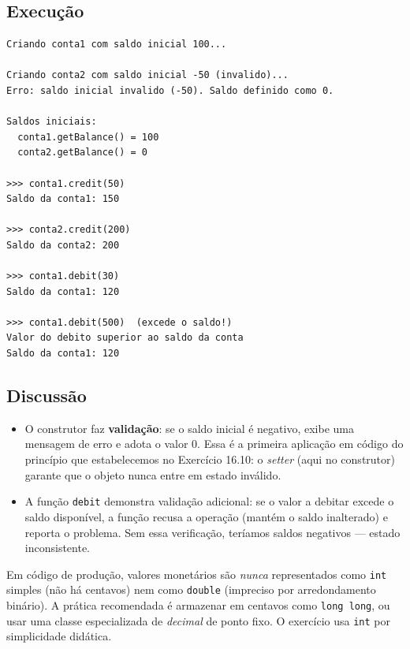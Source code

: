 \documentclass[11pt,a4paper]{article}
\begin{document}


\subsection*{Execu\c{c}\~ao}

\begin{saidabox}
\begin{lstlisting}[style=terminal]
Criando conta1 com saldo inicial 100...

Criando conta2 com saldo inicial -50 (invalido)...
Erro: saldo inicial invalido (-50). Saldo definido como 0.

Saldos iniciais:
  conta1.getBalance() = 100
  conta2.getBalance() = 0

>>> conta1.credit(50)
Saldo da conta1: 150

>>> conta2.credit(200)
Saldo da conta2: 200

>>> conta1.debit(30)
Saldo da conta1: 120

>>> conta1.debit(500)  (excede o saldo!)
Valor do debito superior ao saldo da conta
Saldo da conta1: 120
\end{lstlisting}
\end{saidabox}

\subsection*{Discuss\~ao}

\begin{itemize}[leftmargin=*]
  \item O construtor faz \textbf{valida\c{c}\~ao}: se o saldo inicial \'e negativo, exibe uma mensagem de erro e adota o valor 0. Essa \'e a primeira aplica\c{c}\~ao em c\'odigo do princ\'ipio que estabelecemos no Exerc\'icio 16.10: o \emph{setter} (aqui no construtor) garante que o objeto nunca entre em estado inv\'alido.
  \item A fun\c{c}\~ao \texttt{debit} demonstra valida\c{c}\~ao adicional: se o valor a debitar excede o saldo dispon\'ivel, a fun\c{c}\~ao recusa a opera\c{c}\~ao (mant\'em o saldo inalterado) e reporta o problema. Sem essa verifica\c{c}\~ao, ter\'iamos saldos negativos --- estado inconsistente.
\end{itemize}

\begin{obseng}
Em c\'odigo de produ\c{c}\~ao, valores monet\'arios s\~ao \emph{nunca} representados como \texttt{int} simples (n\~ao h\'a centavos) nem como \texttt{double} (impreciso por arredondamento bin\'ario). A pr\'atica recomendada \'e armazenar em centavos como \texttt{long long}, ou usar uma classe especializada de \emph{decimal} de ponto fixo. O exerc\'icio usa \texttt{int} por simplicidade did\'atica.
\end{obseng}
\end{document}
